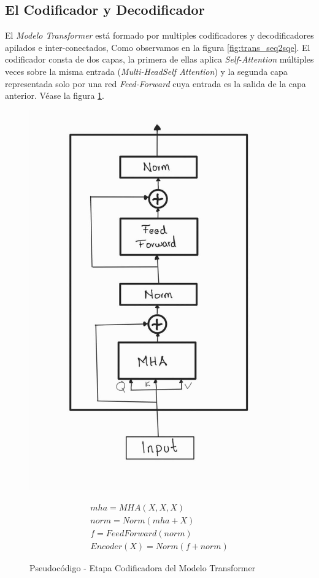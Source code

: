 \subsection{El Codificador y Decodificador}

El \textit{Modelo Transformer} está formado por multiples codificadores  y decodificadores apilados e inter-conectados,
Como observamos en la figura \ref{fig:trans_seq2sqe}. El codificador consta de dos capas,
la primera de ellas aplica \textit{Self-Attention} múltiples veces sobre la misma entrada
(\textit{Multi-HeadSelf Attention}) y la segunda capa representada solo por una red
\textit{Feed-Forward} cuya entrada es la salida de la capa anterior.
Véase la figura \ref{fig:trans_encoder}.


\begin{figure}[ht!]
\centering
    \begin{minipage}{.4\textwidth}
        \centering
        \includegraphics[width=0.7 \textwidth]{Chapters/2. Transformer/Figures/transformer/encoder.jpg}
    \end{minipage}
    \begin{minipage}{.5\textwidth}
        \begin{equation*}
            \begin{split}
                mha = MHA(X, X, X)\\
                norm = Norm( mha + X)\\
                f = FeedForward(norm)\\
                Encoder(X) = Norm(f + norm)
            \end{split}
            \label{eq:trans_enc}
        \end{equation*}
    \end{minipage}
    \caption{Pseudocódigo - Etapa Codificadora del Modelo Transformer}
    \label{fig:trans_encoder}
\end{figure}


